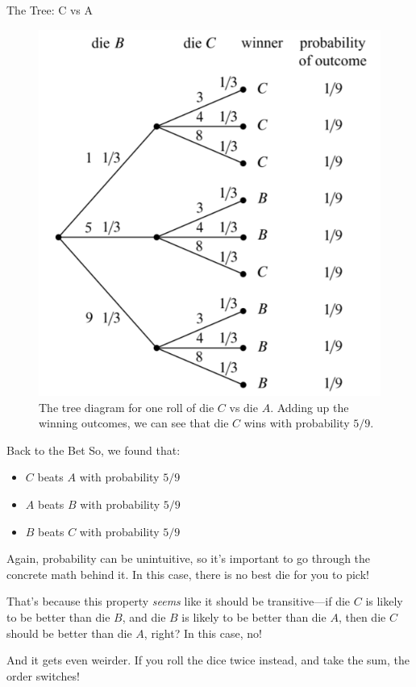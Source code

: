 \documentclass{beamer}
\begin{document}
\begin{frame}{The Tree: C vs A}
    \begin{figure}
        \centering
        \includegraphics[scale=.5]{strangebvsc.png}
        \caption{The tree diagram for one roll of die $C$ vs die $A$. Adding up the winning outcomes, we can see that die $C$ wins with probability $5/9$.}
        \label{fig:my_label}
    \end{figure}
\end{frame}

\begin{frame}{Back to the Bet}
    So, we found that:
    \begin{itemize}
        \item $C$ beats $A$ with probability $5/9$
        \item $A$ beats $B$ with probability $5/9$
        \item $B$ beats $C$ with probability $5/9$
    \end{itemize}
    Again, probability can be unintuitive, so it's important to go through the concrete math behind it. In this case, there is no best die for you to pick! \vspace{2mm}
    
    That's because this property \textit{seems} like it should be transitive---if die $C$ is likely to be better than die $B$, and die $B$ is likely to be better than die $A$, then die $C$ should be better than die $A$, right? In this case, no! \vspace{2mm}
    
    And it gets even weirder. If you roll the dice twice instead, and take the sum, the order switches!
\end{frame}
\end{document}
